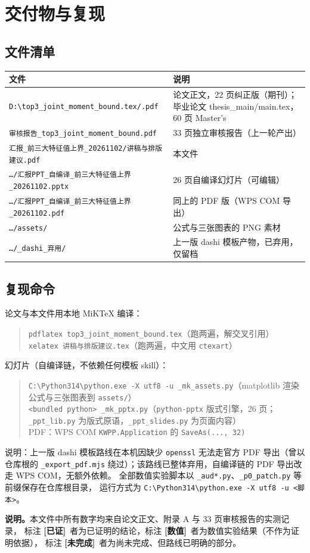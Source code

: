 \documentclass[UTF8,11pt]{ctexart}
\newcommand{\file}[1]{\texttt{#1}}
\newcommand{\ok}{\textcolor[rgb]{0.05,0.45,0.15}{\bfseries [已证]}}
\newcommand{\num}{\textcolor[rgb]{0.55,0.35,0.00}{\bfseries [数值]}}
\newcommand{\todo}{\textcolor[rgb]{0.70,0.15,0.10}{\bfseries [未完成]}}
\begin{document}
\section{交付物与复现}

\subsection*{文件清单}
\begin{center}
\small
\begin{tabular}{@{}p{8.1cm}p{5.6cm}@{}}
\toprule
文件 & 说明 \\
\midrule
\file{D:\textbackslash top3\_joint\_moment\_bound.tex/.pdf} & 论文正文，22 页纠正版（期刊）；毕业论文 thesis\_main/main.tex，60 页 Master's \\
\file{审核报告\_top3\_joint\_moment\_bound.pdf} & 33 页独立审核报告（上一轮产出） \\
\file{汇报\_前三大特征值上界\_20261102/讲稿与排版建议.pdf} & 本文件 \\
\file{\ldots/汇报PPT\_自编译\_前三大特征值上界\_20261102.pptx} & 26 页自编译幻灯片（可编辑） \\
\file{\ldots/汇报PPT\_自编译\_前三大特征值上界\_20261102.pdf} & 同上的 PDF 版（WPS COM 导出） \\
\file{\ldots/assets/} & 公式与三张图表的 PNG 素材 \\
\file{\ldots/\_dashi\_弃用/} & 上一版 dashi 模板产物，已弃用，仅留档 \\
\bottomrule
\end{tabular}
\end{center}

\subsection*{复现命令}
论文与本文件用本地 MiKTeX 编译：
\begin{quote}\small\raggedright
\file{pdflatex top3\_joint\_moment\_bound.tex}（跑两遍，解交叉引用）\\
\file{xelatex 讲稿与排版建议.tex}（跑两遍，中文用 \file{ctexart}）
\end{quote}
幻灯片（自编译链，不依赖任何模板 skill）：
\begin{quote}\small\raggedright
\file{C:\textbackslash Python314\textbackslash python.exe -X utf8 -u \_mk\_assets.py}（matplotlib 渲染公式与三张图表到 \file{assets/}）\\
\file{<bundled python> \_mk\_pptx.py}（\file{python-pptx} 版式引擎，26 页；\file{\_ppt\_lib.py} 为版式原语，\file{\_ppt\_slides.py} 为页面内容）\\
PDF：WPS COM \file{KWPP.Application} 的 \file{SaveAs(..., 32)}
\end{quote}
说明：上一版 dashi 模板路线在本机因缺少 \file{openssl} 无法走官方 PDF 导出（曾以仓库根的
\file{\_export\_pdf.mjs} 绕过）；该路线已整体弃用，自编译链的 PDF 导出改走 WPS COM，无额外依赖。
全部数值实验脚本以 \file{\_aud*.py}、\file{\_p0\_patch.py} 等前缀保存在仓库根目录，
运行方式为 \file{C:\textbackslash Python314\textbackslash python.exe -X utf8 -u <脚本>}。

\vspace{1em}
\noindent\textbf{说明。}本文件中所有数字均来自论文正文、附录 A 与 33 页审核报告的实测记录，
标注 \ok\ 者为已证明的结论，标注 \num\ 者为数值实验结果（不作为证明依据），
标注 \todo\ 者为尚未完成、但路线已明确的部分。
\end{document}
